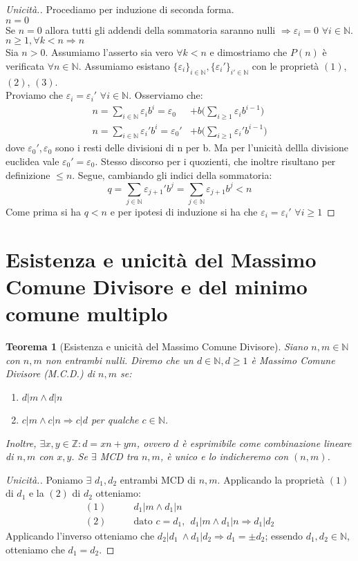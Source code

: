 \documentclass[12pt,twoscolu]{article}
\newcommand{\N}{\mathbb{N}}
\newcommand{\Z}{\mathbb{Z}}
\newcommand{\implica}{\Longrightarrow}
\newcommand{\nin}{\forall n\in\N}
\newcommand{\eps}{\varepsilon}
\renewcommand\qedsymbol{$\blacksquare$}
\newcommand{\baseinduz}[1]{\\[1\baselineskip]{\boldmath$n = #1$}}
\newcommand{\induzdue}[1]{\\[1\baselineskip]{\boldmath$n \ge #1, \forall k < n \implica n$}}
\newtheorem{theorem}{Teorema}
\begin{document}
\renewcommand\qedsymbol{$\blacksquare$}
\begin{proof}[Unicità.]
Procediamo per induzione di seconda forma.
\baseinduz{0}
\\Se $n = 0$ allora tutti gli addendi della sommatoria saranno nulli $\implica \eps_i = 0$ $\forall i \in \N$.
\induzdue{1}
\\Sia $n > 0$. Assumiamo l'asserto sia vero $\forall k < n$ e dimostriamo che $P(n)$ è verificata $\nin$.
Assumiamo esistano $\{\eps_i\}_{i\in\N}, \{\eps_i'\}_{i' \in\N}$ con le proprietà $(1)$, $(2)$, $(3)$.\\Proviamo che $\eps_i = \eps_{i}'$ $\forall i \in \N$. Osserviamo che:
\begin{align*}
n =\sum_{i\in\N} \eps_i b^i = \eps_0 &+ b\Bigg( \sum_{i \ge 1} \eps_i b^{i-1}\Bigg) \\
n =\sum_{i\in\N} \eps_{i}' b^i = \eps_{0}' &+ b\Bigg( \sum_{i \ge 1} \eps_{i}' b^{i-1}\Bigg)
\end{align*}
dove $\eps_{0}',\eps_{0}$ sono i resti delle divisioni di n per b. Ma per l'unicità dellla divisione euclidea vale $\eps_{0}' = \eps_{0}$. Stesso discorso per i quozienti, che inoltre risultano per definizione $\le n$. Segue, cambiando gli indici della sommatoria:
$$q = \sum_{j\in\N} \eps_{j+1}' b^j = \sum_{j\in\N} \eps_{j+1} b^j < n $$
Come prima si ha $q < n$ e per ipotesi di induzione si ha che $\eps_i = \eps_{i}'$ $\forall i \ge 1$
\end{proof}

\section{Esistenza e unicità del Massimo Comune Divisore e del minimo comune multiplo}
\begin{theorem}[Esistenza e unicità del Massimo Comune Divisore]
Siano $n, m \in \N$ con $n, m$ non entrambi nulli. Diremo che un $d \in \N, d \ge 1$ è Massimo Comune Divisore (M.C.D.) di $n, m$ se:
\begin{enumerate}
\item$d | m \land d | n $
\item$c | m \land c | n \implica c | d$ per qualche $c \in \N$.
\end{enumerate}
Inoltre, $\exists x, y \in \Z : d = xn + ym$, ovvero $d$ è esprimibile come combinazione lineare di $n, m$ con $x, y$.  Se $\exists$ MCD tra $n, m$, è unico e lo indicheremo con $(n, m)$.
\end{theorem}

\renewcommand\qedsymbol{$\square$}
\begin{proof}[Unicità.]
Poniamo $\exists$ $d_1, d_2$ entrambi MCD di $n, m$. Applicando la proprietà $(1)$ di $d_1$ e la $(2)$ di $d_2$ otteniamo:
\begin{align*}
(1)\qquad& d_1 | m \land d_1 | n \\
(2)\qquad& \text{dato }c = d_1, \ \ d_1 | m \land d_1 | n \implica d_1 | d_2
\end{align*}
Applicando l'inverso otteniamo che $d_2 | d_1\ \land d_1 | d_2 \implica d_1 = \pm d_2$; essendo $d_1, d_2 \in \N$, otteniamo che
$ d_1 = d_2$.
\end{proof}
\end{document}
